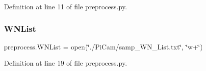 Definition at line 11 of file preprocess.\+py.

\mbox{\label{namespacepreprocess_ae2d4eaefaa9cce6f8e750dcc58233ca3}} 
\subsubsection{W\+N\+List}
{\footnotesize\ttfamily preprocess.\+W\+N\+List = open(\char`\"{}./Pi\+Cam/samp\+\_\+\+W\+N\+\_\+\+List.\+txt\char`\"{}, \char`\"{}w+\char`\"{})}



Definition at line 19 of file preprocess.\+py.

